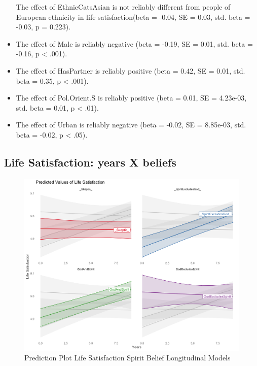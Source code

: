 \documentclass[
  english,
  man]{apa6}
\begin{document}
\begin{itemize}
  The effect of EthnicCatsAsian is not reliably different from people of European ethnicity in life satisfaction(beta = -0.04, SE = 0.03, std. beta = -0.03, p = 0.223).
\item
  The effect of Male is reliably negative (beta = -0.19, SE = 0.01, std. beta = -0.16, p \textless{} .001).
\item
  The effect of HasPartner is reliably positive (beta = 0.42, SE = 0.01, std. beta = 0.35, p \textless{} .001).
\item
  The effect of Pol.Orient.S is reliably positive (beta = 0.01, SE = 4.23e-03, std. beta = 0.01, p \textless{} .01).
\item
  The effect of Urban is reliably negative (beta = -0.02, SE = 8.85e-03, std. beta = -0.02, p \textless{} .05).
\end{itemize}

\hypertarget{life-satisfaction-years-x-beliefs}{%
\subsection{Life Satisfaction: years X beliefs}\label{life-satisfaction-years-x-beliefs}}

\begin{figure}
\includegraphics[width=6.4in]{Figs/USElifsat_expected-1} \caption{Prediction Plot Life Satisfaction Spirit Belief Longitudinal Models}\label{fig:unnamed-chunk-3}
\end{figure}
\end{document}

